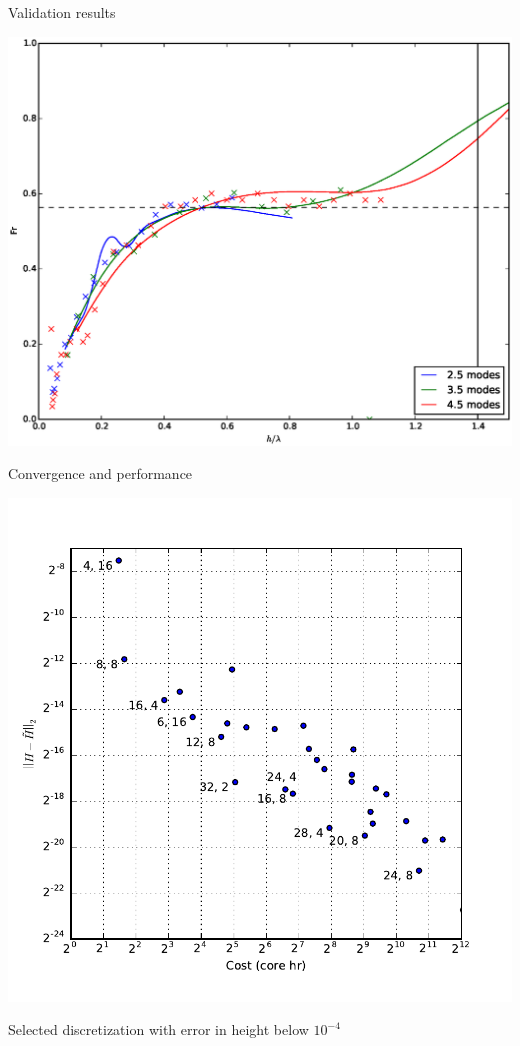 \documentclass[12pt]{beamer}
\begin{document}
\begin{frame}{Validation results}
\begin{center}
\includegraphics[height=0.9\textheight]{graphics/Fr.eps}
\end{center}
\end{frame}

\begin{frame}{Convergence and performance}
\begin{center}
\vspace{-10pt}
\includegraphics[height=0.89\textheight]{graphics/mira_H.pdf}
\end{center}
\vspace{-20pt}
Selected discretization with error in height below $10^{-4}$
\end{frame}
\end{document}
